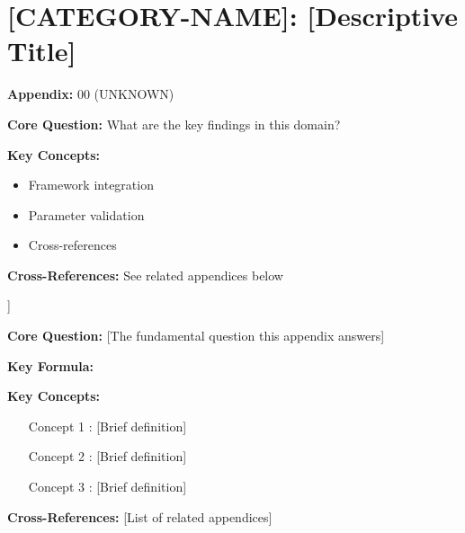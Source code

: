 
\chapter{[CATEGORY-NAME]: [Descriptive Title]}
\label{app:[short-label]}


\begin{tcolorbox}[colback=blue!5!white, colframe=blue!75!black,
    title=Quick Reference: Appendix 00]

\textbf{Appendix:} 00 (UNKNOWN)

\textbf{Core Question:} What are the key findings in this domain?

\textbf{Key Concepts:}
\begin{itemize}[nosep]
\item Framework integration
\item Parameter validation
\item Cross-references
\end{itemize}

\textbf{Cross-References:} See related appendices below
\end{tcolorbox}


\begin{abstract}
[Maximum 100 words describing:]
- What question this appendix answers
- What the main contribution is
- How it connects to EBF
\end{abstract}


\begin{tcolorbox}[colback=blue!5!white, colframe=blue!75!black, 
    title=Quick Reference: [Appendix Name]]

\textbf{Core Question:} [The fundamental question this appendix answers]

\textbf{Key Formula:}
\begin{equation}
[The most important equation]
\end{equation}

\textbf{Key Concepts:}
\begin{itemize}[nosep]
\item [Concept 1]: [Brief definition]
\item [Concept 2]: [Brief definition]
\item [Concept 3]: [Brief definition]
\end{itemize}

\textbf{Cross-References:} [List of related appendices]
\end{tcolorbox}

